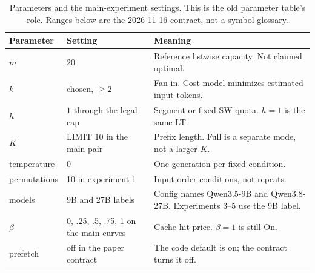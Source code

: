 \begin{table}[t]
\caption{Parameters and the main-experiment settings. This is the old parameter table's role. Ranges below are the 2026-11-16 contract, not a symbol glossary.}
\centering\footnotesize
\begin{tabular}{@{}llp{4.6cm}@{}}
\toprule
Parameter & Setting & Meaning \\
\midrule
$m$ & 20 & Reference listwise capacity. Not claimed optimal. \\
$k$ & chosen, $\ge 2$ & Fan-in. Cost model minimizes estimated input tokens. \\
$h$ & $1$ through the legal cap & Segment or fixed SW quota. $h{=}1$ is the same LT. \\
$K$ & LIMIT 10 in the main pair & Prefix length. Full is a separate mode, not a larger $K$. \\
temperature & 0 & One generation per fixed condition. \\
permutations & 10 in experiment 1 & Input-order conditions, not repeats. \\
models & 9B and 27B labels & Config names Qwen3.5-9B and Qwen3.8-27B. Experiments 3--5 use the 9B label. \\
$\beta$ & 0, .25, .5, .75, 1 on the main curves & Cache-hit price. $\beta{=}1$ is still On. \\
prefetch & off in the paper contract & The code default is on; the contract turns it off. \\
\bottomrule
\end{tabular}
\end{table}


